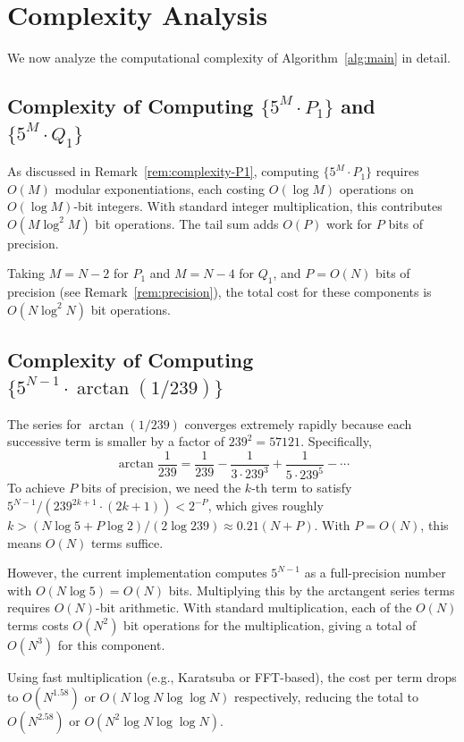 \documentclass[11pt]{article}
\begin{document}
\section{Complexity Analysis}

We now analyze the computational complexity of Algorithm~\ref{alg:main} in detail.

\subsection{Complexity of Computing $\{5^M \cdot P_1\}$ and $\{5^M \cdot Q_1\}$}

As discussed in Remark~\ref{rem:complexity-P1}, computing $\{5^M \cdot P_1\}$ requires $O(M)$ modular exponentiations, each costing $O(\log M)$ operations on $O(\log M)$-bit integers. With standard integer multiplication, this contributes $O(M \log^2 M)$ bit operations. The tail sum adds $O(P)$ work for $P$ bits of precision.

Taking $M = N - 2$ for $P_1$ and $M = N - 4$ for $Q_1$, and $P = O(N)$ bits of precision (see Remark~\ref{rem:precision}), the total cost for these components is $O(N \log^2 N)$ bit operations.

\subsection{Complexity of Computing $\{5^{N-1} \cdot \arctan(1/239)\}$}

The series for $\arctan(1/239)$ converges extremely rapidly because each successive term is smaller by a factor of $239^2 = 57121$. Specifically,
\[
\arctan\frac{1}{239} = \frac{1}{239} - \frac{1}{3 \cdot 239^3} + \frac{1}{5 \cdot 239^5} - \cdots
\]
To achieve $P$ bits of precision, we need the $k$-th term to satisfy $5^{N-1}/(239^{2k+1} \cdot (2k+1)) < 2^{-P}$, which gives roughly $k > (N \log 5 + P \log 2) / (2 \log 239) \approx 0.21(N + P)$. With $P = O(N)$, this means $O(N)$ terms suffice.

However, the current implementation computes $5^{N-1}$ as a full-precision number with $O(N \log 5) = O(N)$ bits. Multiplying this by the arctangent series terms requires $O(N)$-bit arithmetic. With standard multiplication, each of the $O(N)$ terms costs $O(N^2)$ bit operations for the multiplication, giving a total of $O(N^3)$ for this component.

Using fast multiplication (e.g., Karatsuba or FFT-based), the cost per term drops to $O(N^{1.58})$ or $O(N \log N \log \log N)$ respectively, reducing the total to $O(N^{2.58})$ or $O(N^2 \log N \log \log N)$.
\end{document}
